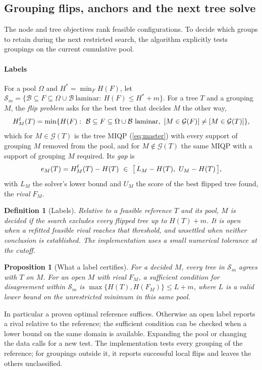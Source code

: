 \documentclass[journal,onecolumn,11pt]{IEEEtran}
\newtheorem{proposition}{Proposition}
\newtheorem{definition}{Definition}
\newcommand{\Bset}{\mathcal{B}}
\newcommand{\Sset}{\mathcal{S}}
\newcommand{\Gset}{\mathcal{G}}
\begin{document}
\subsection{Grouping flips, anchors and the next tree solve}
The node and tree objectives rank feasible configurations. To decide which groups to retain during the next
restricted search, the algorithm explicitly tests groupings on the current cumulative pool.

\paragraph*{Labels} For a pool $\Omega$ and $H^*=\min_FH(F)$, let
$\Sset_m=\{\Bset\subseteq F\subseteq\Omega\cup\Bset\ \text{laminar}:\ H(F)\le H^*+m\}$. For a tree $T$ and a grouping $M$, the \emph{flip
problem} asks for the best tree that decides $M$ the other way,
\begin{equation}\label{eq:flip}
H^{\rm f}_M(T)=\min\{H(F):\ \Bset\subseteq F\subseteq\Omega\cup\Bset\ \text{laminar},\ [M\in\Gset(F)]\neq[M\in\Gset(T)]\},
\end{equation}
which for $M\in\Gset(T)$ is the tree MIQP (\ref{eq:master}) with every support of grouping $M$ removed from the pool, and
for $M\notin\Gset(T)$ the same MIQP with a support of grouping $M$ required. Its
\emph{gap} is
\begin{equation}\label{eq:gap}
e_M(T)=H^{\rm f}_M(T)-H(T)\ \in\ \big[\,L_M-H(T),\ U_M-H(T)\,\big],
\end{equation}
with $L_M$ the solver's lower bound and $U_M$ the score of the best flipped tree found, the \emph{rival} $F_M$.
\begin{definition}[Labels]
Relative to a feasible reference $T$ and its pool, $M$ is \emph{decided} if the search excludes every flipped tree up
to $H(T)+m$. It is \emph{open} when a refitted feasible rival reaches that threshold, and \emph{unsettled} when neither
conclusion is established. The implementation uses a small numerical tolerance at the cutoff.
\end{definition}
\begin{proposition}[What a label certifies]\label{prop:label}
For a decided $M$, every tree in $\Sset_m$ agrees with $T$ on $M$. For an open $M$ with rival $F_M$, a sufficient
condition for disagreement within $\Sset_m$ is
$\max\{H(T),H(F_M)\}\le L+m$, where $L$ is a valid lower bound on the unrestricted minimum in this same pool.
\end{proposition}
In particular a proven optimal reference suffices. Otherwise an open label reports a rival relative to the reference;
the sufficient condition can be checked when a lower bound on the same domain is available. Expanding the pool or
changing the data calls for a new test. The implementation tests every grouping of the reference; for groupings
outside it, it reports successful local flips and leaves the others unclassified.
\end{document}
